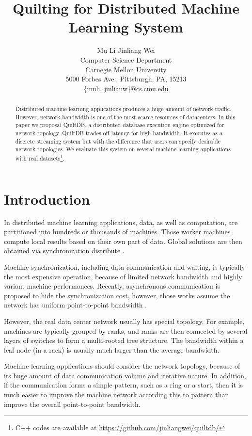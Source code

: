 \documentclass[11pt, twocolumn]{article}
\title{Quilting for Distributed Machine Learning System}
\author{Mu Li \quad Jinliang Wei\\ Computer Science Department
  \\Carnegie Mellon University\\
  5000 Forbes Ave., Pittsburgh, PA, 15213\\
\{muli, jinlianw\}@cs.cmu.edu}
\begin{document}
\maketitle

\begin{abstract}
  Distributed machine learning applications produces a huge amount of network
  traffic. However, network bandwidth is one of the most scarce resources of
  datacenters.  In this paper we proposal QuiltDB, a distributed database
  execution engine optimized for network topology. QuiltDB trades off latency
  for high bandwidth. It executes as a discrete streaming system but with the
  difference that
  users can specify desirable network topologies. We evaluate this system on
  several machine learning applications with real datasets\footnote{C++ codes
    are available at \url{https://github.com/jinliangwei/quiltdb/}}.
\end{abstract}

\section{Introduction}

In distributed machine learning applications, data,  as well as computation, are
partitioned into hundreds or  thousands of machines. Those
worker machines compute local results based on their own part of data. Global solutions
are then obtained via synchronization distribute \cite{AhmSheNarJosSmo13,
  HoCipCuiLeeetal13,Lietal13,DeaCorMonCheetal12,GonLowGuBicetal12,CheSonBaiLinetal11}.

Machine synchronization, including data communication and waiting, is typically
the most expensive operation, because of limited network bandwidth and highly
variant machine performances. Recently, asynchronous communication is proposed
to hide the synchronization cost, however, those works assume the network has
uniform point-to-point bandwidth \cite{AsuSmyWel08,SmoNar10,AhmSheNarJosSmo13,Lietal13}.

However, the real data center network usually has special topology. For
example, machines are typically grouped by ranks, and ranks are then connected by
several layers of switches to form a multi-rooted tree structure. The bandwidth
within a leaf node (in a rack) is usually much larger than the average
bandwidth.

Machine learning applications should consider the network topology, because of
its huge amount of data communication volume and iterative nature. In addition,
if the communication forms a simple pattern, such as a ring or a start, then it
is much easier to improve the machine network according this to pattern than
improve the overall point-to-point bandwidth.
\end{document}
